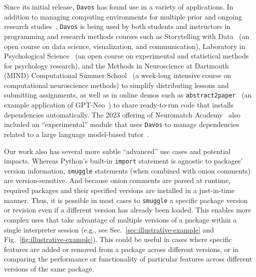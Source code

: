 \documentclass[preprint,12pt,a4paper]{elsarticle}
\begin{document}
Since its initial release, \texttt{Davos} has found use in a variety of applications. In
addition to managing computing environments for multiple prior and ongoing
research studies~\citep{MannEtal23a, OwenMann23, ZimaEtal23}, \texttt{Davos} is being
used by both students and instructors in programming and research methods courses such
as Storytelling with Data~\cite{Mann21a} (an open course on data science,
visualization, and communication), Laboratory in Psychological
Science~\cite{Mann22} (an open course on experimental and statistical methods
for psychology research), and the Methods in Neuroscience at Dartmouth (MIND)
Computational Summer School~\cite{MIND23} (a week-long intensive course on
computational neuroscience methods) to simplify distributing lessons
and submitting assignments, as well as in online demos such as
\texttt{abstract2paper}~\cite{Mann21b} (an example application of
GPT-Neo~\cite{GaoEtal20, BlacEtal21}) to share ready-to-run code that installs
dependencies automatically. The 2023 offering of Neuromatch
Academy~\cite{vanVEtal21} also included an ``experimental'' module that uses
\texttt{Davos} to manage dependencies related to a large language model-based
tutor~\cite{MannEtal23b}.

Our work also has several more subtle ``advanced'' use cases and potential
impacts. Whereas Python's built-in \texttt{import} statement is agnostic to
packages' version information, \texttt{smuggle} statements (when combined with
onion comments) are version-sensitive. And because onion comments are parsed at
runtime, required packages and their specified versions are installed in a
just-in-time manner. Thus, it is possible in most cases to \texttt{smuggle} a
specific package version or revision even if a different version has already
been loaded. This enables more complex uses that take advantage of multiple
versions of a package within a single interpreter session (e.g., see
Sec.~\ref{sec:illustrative-example} and Fig.~\ref{fig:illustrative-example}).
This could be useful in cases where specific features are added or removed from
a package across different versions, or in comparing the performance or
functionality of particular features across different versions of the same
package.
\end{document}
